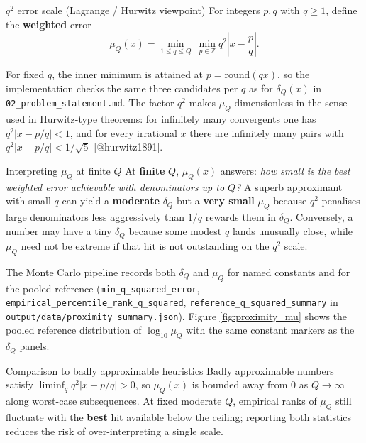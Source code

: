 \documentclass[
  ignorenonframetext,
]{beamer}
\author{\texorpdfstring{}{}}
\date{}
\begin{document}
\begin{frame}[fragile]{\(q^2\) error scale (Lagrange / Hurwitz
viewpoint)}
\protect{}\label{q2-error-scale-lagrange-hurwitz-viewpoint}
For integers \(p,q\) with \(q \geq 1\), define the \textbf{weighted}
error \begin{equation}
\label{eq:lagrange}
\mu_Q(x) = \min_{1 \leq q \leq Q}\ \min_{p \in \mathbb{Z}} q^2 \left| x - \frac{p}{q} \right|.
\end{equation}

For fixed \(q\), the inner minimum is attained at
\(p = \mathrm{round}(qx)\), so the implementation checks the same three
candidates per \(q\) as for \(\delta_Q(x)\) in
\texttt{02\_problem\_statement.md}. The factor \(q^2\) makes \(\mu_Q\)
dimensionless in the sense used in Hurwitz-type theorems: for infinitely
many convergents one has \(q^2|x - p/q| < 1\), and for every irrational
\(x\) there are infinitely many pairs with \(q^2|x-p/q| < 1/\sqrt{5}\)
{[}@hurwitz1891{]}.

\begin{block}{Interpreting \(\mu_Q\) at finite \(Q\)}
\protect{}\label{interpreting-mu_q-at-finite-q}
At \textbf{finite} \(Q\), \(\mu_Q(x)\) answers: \emph{how small is the
best weighted error achievable with denominators up to \(Q\)?} A superb
approximant with small \(q\) can yield a \textbf{moderate} \(\delta_Q\)
but a \textbf{very small} \(\mu_Q\) because \(q^2\) penalises large
denominators less aggressively than \(1/q\) rewards them in
\(\delta_Q\). Conversely, a number may have a tiny \(\delta_Q\) because
some modest \(q\) lands unusually close, while \(\mu_Q\) need not be
extreme if that hit is not outstanding on the \(q^2\) scale.

The Monte Carlo pipeline records both \(\delta_Q\) and \(\mu_Q\) for
named constants and for the pooled reference
(\texttt{min\_q\_squared\_error},
\texttt{empirical\_percentile\_rank\_q\_squared},
\texttt{reference\_q\_squared\_summary} in
\texttt{output/data/proximity\_summary.json}). Figure
\ref{fig:proximity_mu} shows the pooled reference distribution of
\(\log_{10}\mu_Q\) with the same constant markers as the \(\delta_Q\)
panels.
\end{block}

\begin{block}{Comparison to badly approximable heuristics}
\protect{}\label{comparison-to-badly-approximable-heuristics}
Badly approximable numbers satisfy \(\liminf_q q^2|x-p/q|>0\), so
\(\mu_Q(x)\) is bounded away from \(0\) as \(Q\to\infty\) along
worst-case subsequences. At fixed moderate \(Q\), empirical ranks of
\(\mu_Q\) still fluctuate with the \textbf{best} hit available below the
ceiling; reporting both statistics reduces the risk of over-interpreting
a single scale.
\end{block}
\end{frame}
\end{document}

